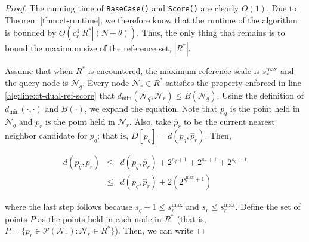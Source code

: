 \begin{proof}
The running time of \texttt{BaseCase()} and \texttt{Score()} are clearly $O(1)$.
Due to Theorem \ref{thm:ct-runtime}, we therefore know that the runtime of the
algorithm is bounded by $O(c_r^4 |R^*| (N + \theta))$.  Thus, the only thing
that remains is to bound the maximum size of the reference set, $|R^*|$.

Assume that when $R^*$ is encountered, the maximum reference scale is
$s_r^{\max}$ and the query node is $\mathscr{N}_q$.  Every node $\mathscr{N}_r
\in R^*$ satisfies the property enforced in line
\ref{alg:line:ct-dual-ref-score} that
$d_{\min}(\mathscr{N}_q, \mathscr{N}_r) \le B(\mathscr{N}_q)$.
Using the definition of $d_{\min}(\cdot, \cdot)$ and $B(\cdot)$, we
expand the equation.  Note that $p_q$ is the point held in $\mathscr{N}_q$ and
$p_r$ is the point held in $\mathscr{N}_r$.  Also, take $\hat{p}_r$ to be the
current nearest neighbor candidate for $p_q$; that is, $D[p_q] = d(p_q,
\hat{p}_r)$.  Then,

\begin{eqnarray}
d(p_q, p_r) &\le& d(p_q, \hat{p}_r) + 2^{s_q + 1} + 2^{s_r + 1} + 2^{s_q + 1}
\label{eqn:pr_dist} \\
 &\le& d(p_q, \hat{p}_r) + 2(2^{s_r^{\max} + 1})
\end{eqnarray}

\noindent where the last step follows because $s_q + 1 \le s_r^{\max}$ and $s_r
\le s_r^{\max}$.  Define the set of points $P$ as the points held in each node
in $R^*$ (that is, $P = \{ p_r \in \mathscr{P}(\mathscr{N}_r) : \mathscr{N}_r
\in R^* \}$).  Then, we can write

%


\end{proof}
